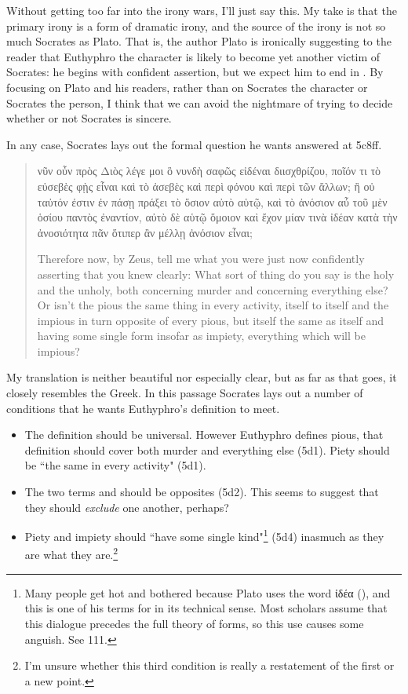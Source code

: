 \documentclass[11pt]{article}
\begin{document}
Without getting too far into the irony wars, I'll just say this.  My take
is that the primary irony is a form of dramatic irony, and the source of
the irony is not so much Socrates as Plato.  That is, the author Plato is
ironically suggesting to the reader that Euthyphro the character is likely
to become yet another victim of Socrates: he begins with confident
assertion, but we expect him to end in .  By focusing on
Plato and his readers, rather than on Socrates the character or Socrates
the person, I think that we can avoid the nightmare of trying to decide
whether or not Socrates is sincere.

In any case, Socrates lays out the formal question he wants answered at
5c8ff.

\begin{quote}
    νῦν οὖν πρὸς Διὸς λέγε μοι ὃ νυνδὴ σαφῶς εἰδέναι διισχθρίζου, ποῖόν τι
    τὸ εὐσεβὲς φῂς εἶναι καὶ τὸ ἀσεβὲς καὶ περὶ φόνου καὶ περὶ τῶν ἄλλων;
    ἢ οὐ ταὐτόν ἐστιν ἐν πάσῃ πράξει τὸ ὅσιον αὐτὸ αὑτῷ, καὶ τὸ ἀνόσιον αὖ
    τοῦ μὲν ὁσίου παντὸς ἐναντίον, αὐτὸ δὲ αὑτῷ ὅμοιον καὶ ἔχον μίαν τινὰ
    ἰδέαν κατὰ τὴν ἀνοσιότητα πᾶν ὅτιπερ ἂν μέλλῃ ἀνόσιον εἶναι;

    Therefore now, by Zeus, tell me what you were just now confidently
    asserting that you knew clearly: What sort of thing do you say is the
    holy and the unholy, both concerning murder and concerning everything
    else? Or isn't the pious the same thing in every activity, itself to
    itself and the impious in turn opposite of every pious, but itself the
    same as itself and having some single form insofar as impiety,
    everything which will be impious?
\end{quote}

My translation is neither beautiful nor especially clear, but as far as
that goes, it closely resembles the Greek.  In this passage Socrates lays
out a number of conditions that he wants Euthyphro's definition to meet.

\begin{itemize}
    \item The definition should be universal.  However Euthyphro defines
        pious, that definition should cover both murder and everything else
        (5d1).  Piety should be ``the same in every activity" (5d1).
    \item The two terms  and  should be
        opposites (5d2).  This seems to suggest that they should
        \emph{exclude} one another, perhaps?
    \item Piety and impiety should ``have some single kind"\footnote{Many
        people get hot and bothered because Plato uses the word ἰδέα
        (), and this is one of his terms for 
        in its technical sense.  Most scholars assume that this dialogue
        precedes the full theory of forms, so this use causes some anguish.
        See \citet{burnet1924} 111.} (5d4) inasmuch as they are what they
        are.\footnote{I'm unsure whether this third condition is really a
        restatement of the first or a new point.}
\end{itemize}
\end{document}
